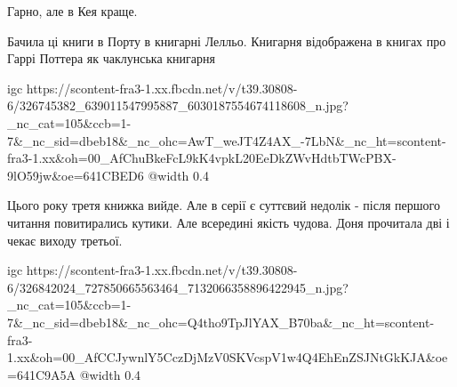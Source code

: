 Гарно, але в Кея краще.


Бачила ці книги в Порту в книгарні Лелльо. Книгарня відображена в книгах про Гаррі Поттера як чаклунська книгарня

\ifcmt
  igc https://scontent-fra3-1.xx.fbcdn.net/v/t39.30808-6/326745382_639011547995887_6030187554674118608_n.jpg?_nc_cat=105&ccb=1-7&_nc_sid=dbeb18&_nc_ohc=AwT_weJT4Z4AX_-7LbN&_nc_ht=scontent-fra3-1.xx&oh=00_AfChuBkeFcL9kK4vpkL20EeDkZWvHdtbTWcPBX-9lO59jw&oe=641CBED6
	@width 0.4
\fi


Цього року третя книжка вийде. Але в серії є суттєвий недолік - після першого
читання повитирались кутики. Але всередині якість чудова. Доня прочитала дві і
чекає виходу третьої.

\ifcmt
  igc https://scontent-fra3-1.xx.fbcdn.net/v/t39.30808-6/326842024_727850665563464_7132066358896422945_n.jpg?_nc_cat=105&ccb=1-7&_nc_sid=dbeb18&_nc_ohc=Q4tho9TpJlYAX_B70ba&_nc_ht=scontent-fra3-1.xx&oh=00_AfCCJywnlY5CczDjMzV0SKVcspV1w4Q4EhEnZSJNtGkKJA&oe=641C9A5A
	@width 0.4
\fi

